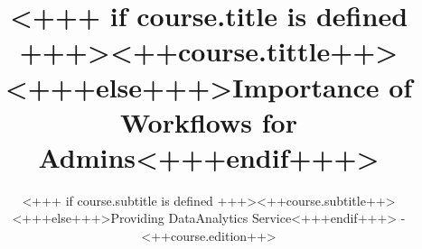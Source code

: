 \documentclass[english,xcolor=pdftex,dvipsnames]{beamer}
\title[<++course.shorttitle++>]{<+++ if course.title is defined +++><++course.tittle++><+++else+++>Importance of \Snakemake Workflows for Admins<+++endif+++>}
\subtitle{<+++ if course.subtitle is defined +++><++course.subtitle++><+++else+++>Providing DataAnalytics Service<+++endif+++> - <++course.edition++>}
\begin{document}

\sloppy

\begin{frame}[plain] %
  \titlepage
\end{frame}








      
%

%  
\end{document}
